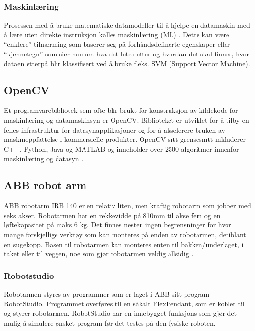\documentclass[conference]{IEEEtran}
\begin{document}
        \subsubsection{Maskinlæring}
            Prosessen med å bruke matematiske datamodeller til å hjelpe en datamaskin med å lære uten direkte instruksjon kalles maskinlæring (ML) \cite{teori:ML}. 
            Dette kan være “enklere” tilnærming som baserer seg på forhåndsdefinerte egenskaper eller “kjennetegn” som sier noe om hva det letes etter 
            og hvordan det skal finnes, hvor dataen etterpå blir klassifisert ved å bruke f.eks. SVM (Support Vector Machine).

    \subsection{OpenCV}
    Et programvarebibliotek som ofte blir brukt for konstruksjon av kildekode for maskinlæring og datamaskinsyn er OpenCV.  Biblioteket er 
    utviklet for å tilby en felles infrastruktur for datasynapplikasjoner og for å akselerere bruken av maskinoppfattelse i kommersielle 
    produkter. OpenCV sitt grensesnitt inkluderer C++, Python, Java og MATLAB og inneholder over 2500 algoritmer innenfor maskinlæring og 
    datasyn \cite{teori:OpenCV}. 

    \subsection{ABB robot arm}
        ABB robotarm IRB 140 er en relativ liten, men kraftig robotarm som jobber med seks akser. Robotarmen har en rekkevidde på 810mm til 
        akse fem og en løftekapasitet på maks 6 kg. Det finnes nesten ingen begrensninger for hvor mange forskjellige verktøy som kan monteres 
        på enden av robotarmen, deriblant en sugekopp. Basen til robotarmen kan monteres enten til bakken/underlaget, i taket eller til veggen, 
        noe som gjør robotarmen veldig allsidig \cite{teori:ABB}. 

    \subsubsection{Robotstudio}
        Robotarmen styres av programmer som er laget i ABB sitt program RobotStudio. Programmet overføres til en såkalt FlexPendant, som er 
        koblet til og styrer robotarmen. RobotStudio har en innebygget funksjons som gjør det mulig å simulere ønsket program før det testes 
        på den fysiske roboten.
\end{document}

